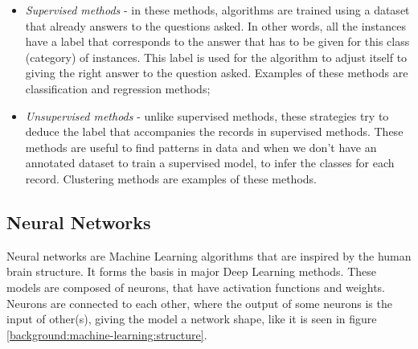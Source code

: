 \documentclass[
  twoside,
  11pt, a4paper,
  footinclude=true,
  headinclude=true,
  cleardoublepage=empty
]{scrbook}
\begin{document}
      \begin{itemize}
        \item \textit{Supervised methods} - in these methods, algorithms are trained using a dataset that already answers to the questions asked. In other words, all the instances have a label that corresponds to the answer that has to be given for this class (category) of instances. This label is used for the algorithm to adjust itself to giving the right answer to the question asked. Examples of these methods are classification and regression methods;
        \item \textit{Unsupervised methods} - unlike supervised methods, these strategies try to deduce the label that accompanies the records in supervised methods. These methods are useful to find patterns in data and when we don't have an annotated dataset to train a supervised model, to infer the classes for each record. Clustering methods are examples of these methods.
      \end{itemize}

      \subsection{Neural Networks}
        Neural networks are Machine Learning algorithms that are inspired by the human brain structure. It forms the basis in major Deep Learning methods. These models are composed of neurons, that have activation functions and weights. Neurons are connected to each other, where the output of some neurons is the input of other(s), giving the model a network shape, like it is seen in figure \ref{background:machine-learning:structure}.

\end{document}
